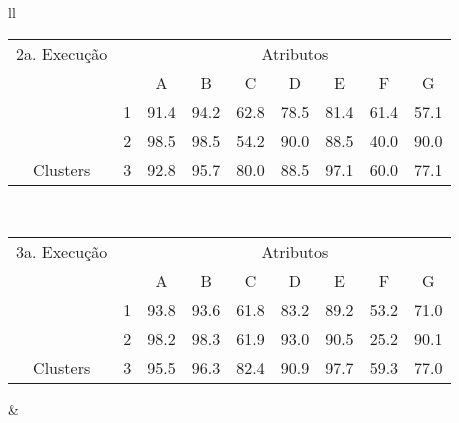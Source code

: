\begin{table}[!h]
\begin{tabular}{ll}
   
   \small\addtolength{\tabcolsep}{-4pt}
   \begin{tabular}{|cl|c|c|c|c|c|c|c|}
        \hline \hline
         {\tiny  2a. Execução} &   & \multicolumn{7}{c|}{Atributos}                                               \\ \cline{3-9} 
       \multicolumn{1}{|l}{}                            &   & A    & B & C & D & E & F & G \\ \hline
        \multicolumn{1}{|c|}{}                           & 1 &  91.4 & 94.2   & 62.8      & 78.5 & 81.4 & 61.4   & 57.1   \\ \cline{2-9} 
        \multicolumn{1}{|c|}{}                           & 2 & 98.5 & 98.5   & 54.2      & 90.0 & 88.5 & 40.0  & 90.0  \\ \cline{2-9} 
        \multicolumn{1}{|c|}{\multirow{-3}{*}{Clusters}} & 3 & 92.8 & 95.7   & 80.0      & 88.5 & 97.1 & 60.0  & 77.1  \\ \hline
      \end{tabular}
  \\  [8ex]
 
   \small\addtolength{\tabcolsep}{-4pt}
   \begin{tabular}{|cl|c|c|c|c|c|c|c|}
        \hline \hline
          {\tiny  3a. Execução}   &   & \multicolumn{7}{c|}{Atributos}                                               \\ \cline{3-9} 
       \multicolumn{1}{|l}{}                            &   & A    & B & C & D & E & F & G \\ \hline
        \multicolumn{1}{|c|}{}                           & 1 & 93.8 & 93.6   & 61.8      & 83.2 & 89.2 & 53.2   & 71.0   \\ \cline{2-9} 
        \multicolumn{1}{|c|}{}                           & 2 & 98.2 & 98.3   & 61.9      & 93.0 & 90.5 & 25.2  & 90.1  \\ \cline{2-9} 
        \multicolumn{1}{|c|}{\multirow{-3}{*}{Clusters}} & 3 & 95.5 & 96.3   & 82.4      & 90.9 & 97.7 & 59.3  & 77.0  \\ \hline
   \end{tabular}
    
    &
    

\end{tabular}
\end{table}
